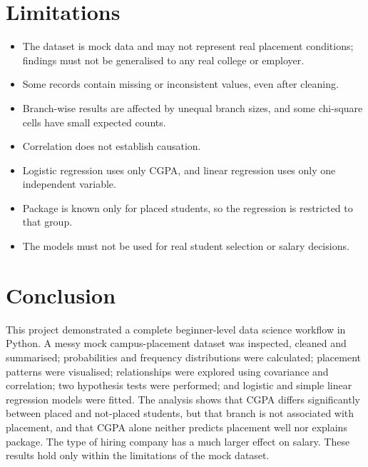 \documentclass[12pt,a4paper]{article}
\begin{document}
\section{Limitations}
\begin{itemize}[noitemsep]
  \item The dataset is mock data and may not represent real placement conditions; findings must not be generalised to any real college or employer.
  \item Some records contain missing or inconsistent values, even after cleaning.
  \item Branch-wise results are affected by unequal branch sizes, and some chi-square cells have small expected counts.
  \item Correlation does not establish causation.
  \item Logistic regression uses only CGPA, and linear regression uses only one independent variable.
  \item Package is known only for placed students, so the regression is restricted to that group.
  \item The models must not be used for real student selection or salary decisions.
\end{itemize}

\section{Conclusion}
This project demonstrated a complete beginner-level data science workflow in Python. A messy mock campus-placement dataset was inspected, cleaned and summarised; probabilities and frequency distributions were calculated; placement patterns were visualised; relationships were explored using covariance and correlation; two hypothesis tests were performed; and logistic and simple linear regression models were fitted. The analysis shows that CGPA differs significantly between placed and not-placed students, but that branch is not associated with placement, and that CGPA alone neither predicts placement well nor explains package. The type of hiring company has a much larger effect on salary. These results hold only within the limitations of the mock dataset.
\end{document}
